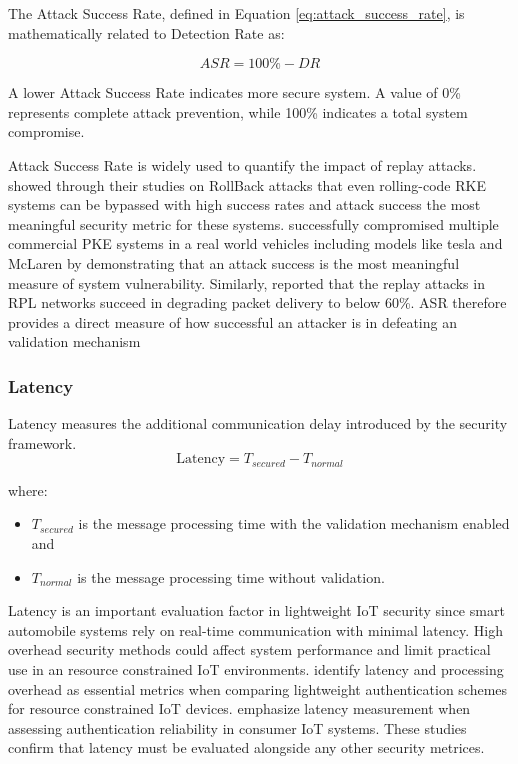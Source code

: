 \documentclass[a4paper,man,12pt]{article}
\begin{document}
The Attack Success Rate, defined in Equation \ref{eq:attack_success_rate}, 
is mathematically related to Detection Rate as:
 
\begin{equation}
ASR = 100\% - DR
\label{eq:asr_dr_relation}
\end{equation}
 
A lower Attack Success Rate indicates more secure system. A value of 0\% represents complete attack prevention, while 100\% indicates a total system compromise.\bigbreak

Attack Success Rate is widely used to quantify the impact of replay attacks. \textcite{001B} showed through their studies on RollBack attacks that even rolling-code RKE systems can be bypassed with high success rates and attack success the most meaningful security metric for these systems.\textcite{005} successfully compromised multiple commercial PKE systems in a
real world vehicles including models like tesla and McLaren by demonstrating 
that an attack success is the most meaningful measure of system vulnerability. Similarly,\textcite{002} reported that the replay attacks in RPL networks succeed in degrading packet delivery to below 60\%. ASR therefore provides a direct measure of how successful an attacker is in defeating an validation mechanism

\subsubsection{Latency}

Latency measures the additional communication delay introduced by the security framework.\\

\begin{equation}
\text{Latency} = T_{secured} - T_{normal}
\label{eq:latency}
\end{equation}

where:
\begin{itemize}
    \item $T_{secured}$ is the message processing time with the validation 
    mechanism enabled and
    \item $T_{normal}$ is the message processing time without validation.
\end{itemize}

Latency is an important evaluation factor in lightweight IoT security since smart automobile systems rely on real-time communication with minimal latency. High overhead security methods could affect system performance and limit practical use in an resource constrained IoT environments.
\textcite{new1} identify latency and processing overhead as essential metrics when comparing lightweight authentication schemes for resource constrained IoT devices. \textcite{mod2} emphasize latency measurement when assessing authentication reliability in consumer IoT systems. These studies confirm that latency must be evaluated alongside any other security metrices.
\end{document}
